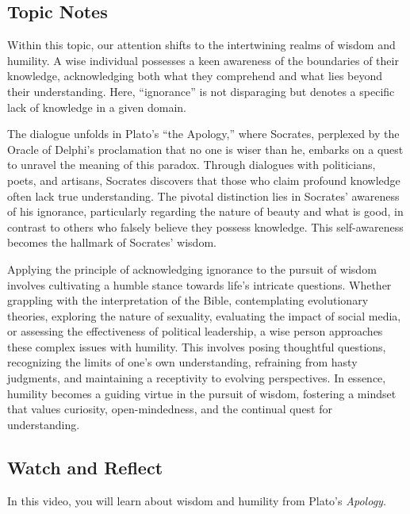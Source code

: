 \documentclass[
]{book}
\begin{document}
\hypertarget{topic-notes-1}{%
\subsection*{Topic Notes}\label{topic-notes-1}}

Within this topic, our attention shifts to the intertwining realms of wisdom and humility. A wise individual possesses a keen awareness of the boundaries of their knowledge, acknowledging both what they comprehend and what lies beyond their understanding. Here, ``ignorance'' is not disparaging but denotes a specific lack of knowledge in a given domain.

The dialogue unfolds in Plato's ``the Apology,'' where Socrates, perplexed by the Oracle of Delphi's proclamation that no one is wiser than he, embarks on a quest to unravel the meaning of this paradox. Through dialogues with politicians, poets, and artisans, Socrates discovers that those who claim profound knowledge often lack true understanding. The pivotal distinction lies in Socrates' awareness of his ignorance, particularly regarding the nature of beauty and what is good, in contrast to others who falsely believe they possess knowledge. This self-awareness becomes the hallmark of Socrates' wisdom.

Applying the principle of acknowledging ignorance to the pursuit of wisdom involves cultivating a humble stance towards life's intricate questions. Whether grappling with the interpretation of the Bible, contemplating evolutionary theories, exploring the nature of sexuality, evaluating the impact of social media, or assessing the effectiveness of political leadership, a wise person approaches these complex issues with humility. This involves posing thoughtful questions, recognizing the limits of one's own understanding, refraining from hasty judgments, and maintaining a receptivity to evolving perspectives. In essence, humility becomes a guiding virtue in the pursuit of wisdom, fostering a mindset that values curiosity, open-mindedness, and the continual quest for understanding.

\hypertarget{watch-and-reflect-2}{%
\subsection*{Watch and Reflect}\label{watch-and-reflect-2}}

In this video, you will learn about wisdom and humility from Plato's \emph{Apology}.
\end{document}
